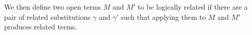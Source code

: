 We then define two open terms $M$ and $M′$ to be logically related
if there are a pair of related substitutions $γ$ and $γ′$ such that
applying them to $M$ and $M′$ produces related terms.

\begin{code}%
\>[0]\AgdaSpace{}%
\AgdaSymbol{:}\AgdaSpace{}%
\AgdaSpace{}%
\AgdaSpace{}%
\AgdaSpace{}%
\AgdaSpace{}%
\AgdaSpace{}%
\AgdaSpace{}%
\AgdaSpace{}%
\AgdaSpace{}%
\AgdaSpace{}%
\AgdaSpace{}%
\AgdaSpace{}%
\<%
\\
\>[0]%
\>[830I]\AgdaSpace{}%
\AgdaSpace{}%
\AgdaSpace{}%
\AgdaSpace{}%
\AgdaSpace{}%
\AgdaSpace{}%
\AgdaSpace{}%
\AgdaSymbol{(\AgdaUnderscore{}}\AgdaSpace{}%
\AgdaOperator{\AgdaInductiveConstructor{,}}\AgdaSpace{}%
\AgdaSymbol{\AgdaUnderscore{}}\AgdaSpace{}%
\AgdaOperator{\AgdaInductiveConstructor{,}}\AgdaSpace{}%
\AgdaSymbol{)}\AgdaSpace{}%
\AgdaSymbol{=}\AgdaSpace{}%
\AgdaSpace{}%
\AgdaSymbol{(}\AgdaSpace{}%
\AgdaSpace{}%
\AgdaSymbol{:}\AgdaSpace{}%
\AgdaSymbol{)}\<%
\\
\>[830I][@{}l@{\AgdaIndent{0}}]%
\>[3]\AgdaSpace{}%
\AgdaSymbol{(}\AgdaSpace{}%
\AgdaSpace{}%
\AgdaSpace{}%
\AgdaSpace{}%
\AgdaSpace{}%
\AgdaSpace{}%
\AgdaSymbol{)}\AgdaSpace{}%
\AgdaSpace{}%
\AgdaSpace{}%
\AgdaSpace{}%
\AgdaSymbol{(}\AgdaSpace{}%
\AgdaSpace{}%
\AgdaSpace{}%
\AgdaSymbol{)}\AgdaSpace{}%
\AgdaSpace{}%
\AgdaSymbol{(}\AgdaSpace{}%
\AgdaSpace{}%
\AgdaSpace{}%
\AgdaSymbol{)}\AgdaSpace{}%
\AgdaSpace{}%
\<%
\end{code}

